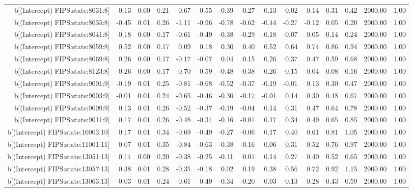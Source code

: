 \begin{table}[ht]
\begin{tabular}{rrrrrrrrrrrrrrr}
  b[(Intercept) FIPS:state:8031:8] & -0.13 & 0.00 & 0.21 & -0.67 & -0.55 & -0.39 & -0.27 & -0.13 & 0.02 & 0.14 & 0.31 & 0.42 & 2000.00 & 1.00 \\ 
  b[(Intercept) FIPS:state:8035:8] & -0.45 & 0.01 & 0.26 & -1.11 & -0.96 & -0.78 & -0.62 & -0.44 & -0.27 & -0.12 & 0.05 & 0.20 & 2000.00 & 1.00 \\ 
  b[(Intercept) FIPS:state:8041:8] & -0.18 & 0.00 & 0.17 & -0.61 & -0.49 & -0.38 & -0.29 & -0.18 & -0.07 & 0.05 & 0.14 & 0.24 & 2000.00 & 1.00 \\ 
  b[(Intercept) FIPS:state:8059:8] & 0.52 & 0.00 & 0.17 & 0.09 & 0.18 & 0.30 & 0.40 & 0.52 & 0.64 & 0.74 & 0.86 & 0.94 & 2000.00 & 1.00 \\ 
  b[(Intercept) FIPS:state:8069:8] & 0.26 & 0.00 & 0.17 & -0.17 & -0.07 & 0.04 & 0.15 & 0.26 & 0.37 & 0.47 & 0.59 & 0.68 & 2000.00 & 1.00 \\ 
  b[(Intercept) FIPS:state:8123:8] & -0.26 & 0.00 & 0.17 & -0.70 & -0.59 & -0.48 & -0.38 & -0.26 & -0.15 & -0.04 & 0.08 & 0.16 & 2000.00 & 1.00 \\ 
  b[(Intercept) FIPS:state:9001:9] & -0.19 & 0.01 & 0.25 & -0.81 & -0.68 & -0.52 & -0.37 & -0.19 & -0.01 & 0.13 & 0.30 & 0.47 & 2000.00 & 1.00 \\ 
  b[(Intercept) FIPS:state:9003:9] & -0.01 & 0.01 & 0.24 & -0.65 & -0.46 & -0.30 & -0.17 & -0.01 & 0.14 & 0.30 & 0.48 & 0.67 & 2000.00 & 1.00 \\ 
  b[(Intercept) FIPS:state:9009:9] & 0.13 & 0.01 & 0.26 & -0.52 & -0.37 & -0.19 & -0.04 & 0.14 & 0.31 & 0.47 & 0.64 & 0.78 & 2000.00 & 1.00 \\ 
  b[(Intercept) FIPS:state:9011:9] & 0.17 & 0.01 & 0.26 & -0.48 & -0.34 & -0.16 & -0.01 & 0.17 & 0.34 & 0.49 & 0.65 & 0.85 & 2000.00 & 1.00 \\ 
  b[(Intercept) FIPS:state:10003:10] & 0.17 & 0.01 & 0.34 & -0.69 & -0.49 & -0.27 & -0.06 & 0.17 & 0.40 & 0.61 & 0.81 & 1.05 & 2000.00 & 1.00 \\ 
  b[(Intercept) FIPS:state:11001:11] & 0.07 & 0.01 & 0.35 & -0.84 & -0.63 & -0.38 & -0.16 & 0.06 & 0.31 & 0.52 & 0.76 & 0.97 & 2000.00 & 1.00 \\ 
  b[(Intercept) FIPS:state:13051:13] & 0.14 & 0.00 & 0.20 & -0.38 & -0.25 & -0.11 & 0.01 & 0.14 & 0.27 & 0.40 & 0.52 & 0.65 & 2000.00 & 1.00 \\ 
  b[(Intercept) FIPS:state:13057:13] & 0.38 & 0.01 & 0.28 & -0.35 & -0.18 & 0.02 & 0.19 & 0.38 & 0.56 & 0.72 & 0.92 & 1.15 & 2000.00 & 1.00 \\ 
  b[(Intercept) FIPS:state:13063:13] & -0.03 & 0.01 & 0.24 & -0.61 & -0.49 & -0.34 & -0.20 & -0.03 & 0.13 & 0.28 & 0.43 & 0.59 & 2000.00 & 1.00 \\ 

\end{tabular}
\end{table}
